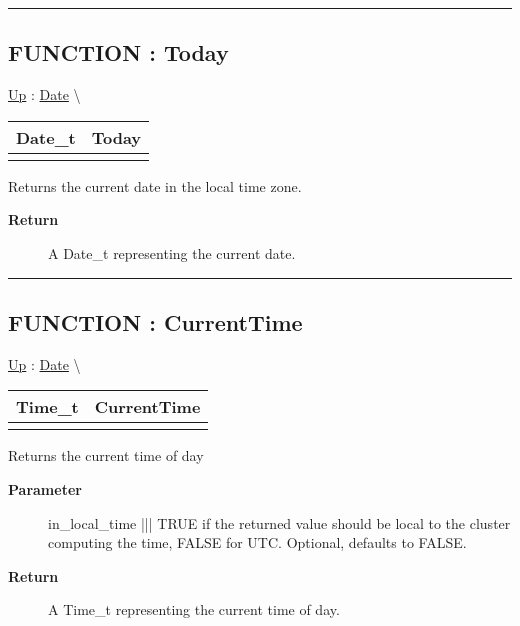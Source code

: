 \rule{\linewidth}{0.5pt}
\subsection*{FUNCTION : Today}
\hypertarget{ecldoc:date.today}{}
\hyperlink{ecldoc:Date}{Up} :
\hspace{0pt} \hyperlink{ecldoc:Date}{Date} \textbackslash 

{\renewcommand{\arraystretch}{1.5}
\begin{tabularx}{\textwidth}{|>{\raggedright\arraybackslash}l|X|}
\hline
\hspace{0pt}Date\_t & Today \\
\hline
\multicolumn{2}{|>{\raggedright\arraybackslash}X|}{\hspace{0pt}()} \\
\hline
\end{tabularx}
}

\par
Returns the current date in the local time zone.

\par
\begin{description}
\item [\textbf{Return}] A Date\_t representing the current date.
\end{description}

\rule{\linewidth}{0.5pt}
\subsection*{FUNCTION : CurrentTime}
\hypertarget{ecldoc:date.currenttime}{}
\hyperlink{ecldoc:Date}{Up} :
\hspace{0pt} \hyperlink{ecldoc:Date}{Date} \textbackslash 

{\renewcommand{\arraystretch}{1.5}
\begin{tabularx}{\textwidth}{|>{\raggedright\arraybackslash}l|X|}
\hline
\hspace{0pt}Time\_t & CurrentTime \\
\hline
\multicolumn{2}{|>{\raggedright\arraybackslash}X|}{\hspace{0pt}(BOOLEAN in\_local\_time = FALSE)} \\
\hline
\end{tabularx}
}

\par
Returns the current time of day

\par
\begin{description}
\item [\textbf{Parameter}] in\_local\_time ||| TRUE if the returned value should be local to the cluster computing the time, FALSE for UTC. Optional, defaults to FALSE.
\item [\textbf{Return}] A Time\_t representing the current time of day.
\end{description}

